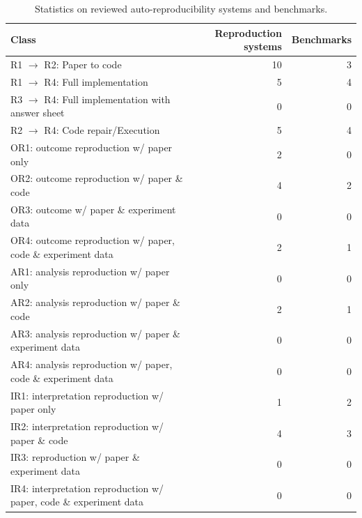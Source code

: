 \documentclass[8pt,a4paper]{article}
\begin{document}
\begin{table}[H]
\centering
\caption{Statistics on reviewed auto-reproducibility systems and
benchmarks.}
\label{tab:reprostatstable}
\begin{tabularx}{\linewidth}{@{}>{\raggedright\arraybackslash}Xrr@{}}
\toprule
\textbf{Class} & \textbf{Reproduction systems} & \textbf{Benchmarks} \\
\midrule
R1 \( \rightarrow \) R2: Paper to code & 10 & 3 \\
R1 \( \rightarrow \) R4: Full implementation & 5 & 4 \\
R3 \( \rightarrow \) R4: Full implementation with answer sheet & 0 & 0 \\
R2 \( \rightarrow \) R4: Code repair/Execution & 5 & 4 \\
OR1: outcome reproduction w/ paper only & 2 & 0 \\
OR2: outcome reproduction w/ paper \& code & 4 & 2 \\
OR3: outcome w/ paper \& experiment data & 0 & 0 \\
OR4: outcome reproduction w/ paper, code \& experiment data & 2 & 1 \\
AR1: analysis reproduction w/ paper only & 0 & 0 \\
AR2: analysis reproduction w/ paper \& code & 2 & 1 \\
AR3: analysis reproduction w/ paper \& experiment data & 0 & 0 \\
AR4: analysis reproduction w/ paper, code \& experiment data & 0 & 0 \\
IR1: interpretation reproduction w/ paper only & 1 & 2 \\
IR2: interpretation reproduction w/ paper \& code & 4 & 3 \\
IR3: reproduction w/ paper \& experiment data & 0 & 0 \\
IR4: interpretation reproduction w/ paper, code \& experiment data & 0 & 0 \\
\bottomrule
\end{tabularx}
\end{table}
\end{document}
